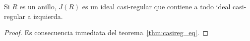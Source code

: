 \begin{corollary}
	Si $R$ es un anillo, $J(R)$ es un ideal casi-regular que contiene a todo
	ideal casi-regular a izquierda.
\end{corollary}

\begin{proof}
	Es consecuencia inmediata del teorema~\ref{thm:casireg_eq}. 
\end{proof}

%
%	

%

%


